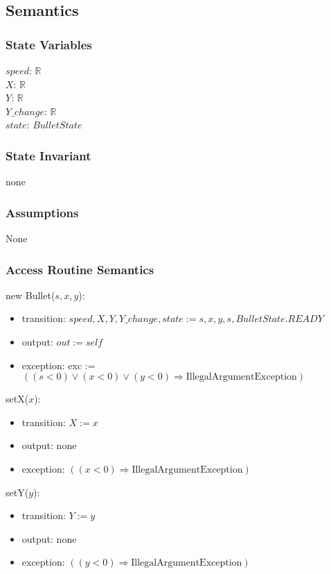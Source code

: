 \documentclass[12pt]{article}
\begin{document}
\subsection*{Semantics}
\subsubsection*{State Variables}
$\mathit{speed}$: $\mathbb{R}$\\
$\mathit{X}$: $\mathbb{R}$\\
$\mathit{Y}$: $\mathbb{R}$\\
$\mathit{Y\_change}$: $\mathbb{R}$\\
$\mathit{state}$: $BulletState$
\subsubsection*{State Invariant}
none
\subsubsection*{Assumptions}
None
\subsubsection*{Access Routine Semantics}
\noindent new Bullet($\mathit{s}, \mathit{x}, \mathit{y}$):
\begin{itemize}
\item transition: $\mathit{speed}, \mathit{X}, \mathit{Y}, \mathit{Y\_change}, \mathit{state} := \mathit{s}, \mathit{x},
  \mathit{y}, s, BulletState.READY$
\item output: $out := \mathit{self}$
\item exception: exc := $((\mathit{s} < 0) \vee (\mathit{x} < 0) \vee 
  (\mathit{y} < 0) \Rightarrow \text{IllegalArgumentException})$
\end{itemize}

\noindent setX($\mathit{x}$):
\begin{itemize}
\item transition: $X := x$ 
\item output: none
\item exception: $((\mathit{x} < 0) \Rightarrow \text{IllegalArgumentException})$
\end{itemize}

\noindent setY($\mathit{y}$):
\begin{itemize}
\item transition: $Y := y$ 
\item output: none
\item exception: $((\mathit{y} < 0) \Rightarrow \text{IllegalArgumentException})$
\end{itemize}
\end{document}
